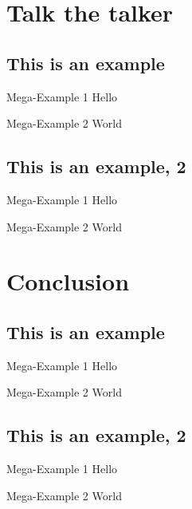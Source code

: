 \documentclass[aspectratio=169,usepdftitle=true,t]{beamer}
\begin{document}
\section{Talk the talker}
\subsection{This is an example}

\begin{frame}{Mega-Example 1}
    Hello
\end{frame}

\begin{frame}{Mega-Example 2}
    World
\end{frame}

\subsection{This is an example, 2}

\begin{frame}{Mega-Example 1}
    Hello
\end{frame}

\begin{frame}{Mega-Example 2}
    World
\end{frame}


\section{Conclusion}
\subsection{This is an example}

\begin{frame}{Mega-Example 1}
    Hello
\end{frame}

\begin{frame}{Mega-Example 2}
    World
\end{frame}

\subsection{This is an example, 2}

\begin{frame}{Mega-Example 1}
    Hello
\end{frame}

\begin{frame}{Mega-Example 2}
    World
\end{frame}
\end{document}
